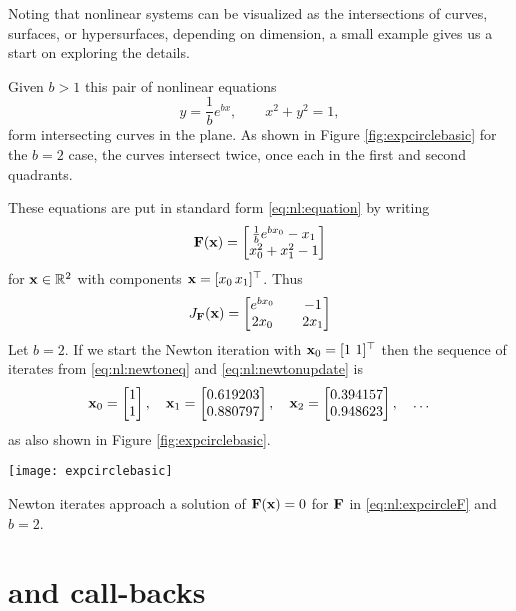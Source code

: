 \vfill
\clearpage
Noting that nonlinear systems can be visualized as the intersections of curves, surfaces, or hypersurfaces, depending on dimension, a small example gives us a start on exploring the details.

\medskip\noindent\hrulefill
\begin{example}  Given $b > 1$ this pair of nonlinear equations
    $$y = \frac{1}{b} e^{bx}, \qquad x^2+y^2 = 1,$$
form intersecting curves in the plane.  As shown in Figure \ref{fig:expcirclebasic} for the $b=2$ case, the curves intersect twice, once each in the first and second quadrants.

These equations are put in standard form \eqref{eq:nl:equation} by writing
\begin{equation}
\label{eq:nl:expcircleF}
\mathbf{F}(\mathbf{x}) = \begin{bmatrix}
           \frac{1}{b} e^{b x_0} - x_1 \\
           x_0^2 + x_1^2 - 1
           \end{bmatrix}
\end{equation}
for $\mathbf{x}\in \mathbb{R}^2$ with components $\mathbf{x} = [x_0 \, x_1]^\top$.  Thus
\begin{equation}
\label{eq:nl:expcircleJac}
J_{\mathbf{F}}(\mathbf{x}) = \begin{bmatrix}
    e^{b x_0} & & -1 \\
    2 x_0   & & 2 x_1 \end{bmatrix}
\end{equation}
Let $b=2$.  If we start the Newton iteration with $\mathbf{x}_0 = [1 \,\, 1]^\top$ then the sequence of iterates from \eqref{eq:nl:newtoneq} and \eqref{eq:nl:newtonupdate} is
    $${\mathbf{x}}_{0} = \begin{bmatrix} 1 \\ 1 \end{bmatrix}, \quad {\mathbf{x}}_{1} = \begin{bmatrix} 0.619203 \\ 0.880797 \end{bmatrix}, \quad {\mathbf{x}}_{2} = \begin{bmatrix} 0.394157 \\ 0.948623 \end{bmatrix}, \quad \dots$$
as also shown in Figure \ref{fig:expcirclebasic}.

\noindent\hrulefill
\end{example}

\begin{marginfigure}
\texttt{[image: expcirclebasic]}
\caption{Newton iterates approach a solution of $\mathbf{F}(\mathbf{x})=0$ for $\mathbf{F}$ in \eqref{eq:nl:expcircleF} and $b=2$.}
\label{fig:expcirclebasic}
\end{marginfigure}


\section{\pSNES and call-backs}

